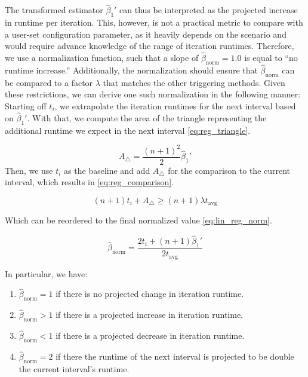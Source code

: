 The transformed estimator $\hat\beta_1'$ can thus be interpreted as the projected increase in runtime per iteration. This, however, is not a practical metric to compare with a user-set configuration parameter, as it heavily depends on the scenario and would require advance knowledge of the range of iteration runtimes. Therefore, we use a normalization function, such that a slope of $\hat\beta_{\text{norm}}=1.0$ is equal to \enquote{no runtime increase.} Additionally, the normalization should ensure that $\hat\beta_{\text{norm}}$ can be compared to a factor $\lambda$ that matches the other triggering methods.
Given these restrictions, we can derive one such normalization in the following manner: Starting off $t_i$, we extrapolate the iteration runtimes for the next interval based on $\hat\beta_1'$. With that, we compute the area of the triangle representing the additional runtime we expect in the next interval \eqref{eq:reg_triangle}.

\begin{equation}
	A_\triangle = \frac{(n+1)^2}{2}\hat\beta_1'\label{eq:reg_triangle}
\end{equation}
Then, we use $t_i$ as the baseline and add $A_\bigtriangleup$ for the comparison to the current interval, which results in \eqref{eq:reg_comparison}.

\begin{equation}
	(n+1)t_i + A_\triangle \ge (n+1)\lambda t_{\text{avg}}\label{eq:reg_comparison}
\end{equation}

Which can be reordered to the final normalized value \eqref{eq:lin_reg_norm}.


\begin{equation}
	\hat\beta_{\text{norm}} = \frac{2t_i+(n+1)\hat\beta_1'}{2t_{\text{avg}}}\label{eq:lin_reg_norm}
\end{equation}

In particular, we have:
\begin{enumerate}[label=(\roman*)]
	\item $\hat\beta_{\text{norm}} = 1$ if there is no projected change in iteration runtime.
	\item $\hat\beta_{\text{norm}} > 1$ if there is a projected increase in iteration runtime.
	\item $\hat\beta_{\text{norm}} < 1$ if there is a projected decrease in iteration runtime.
	\item $\hat\beta_{\text{norm}} = 2$ if there the runtime of the next interval is projected to be double the current interval's runtime.
\end{enumerate}

